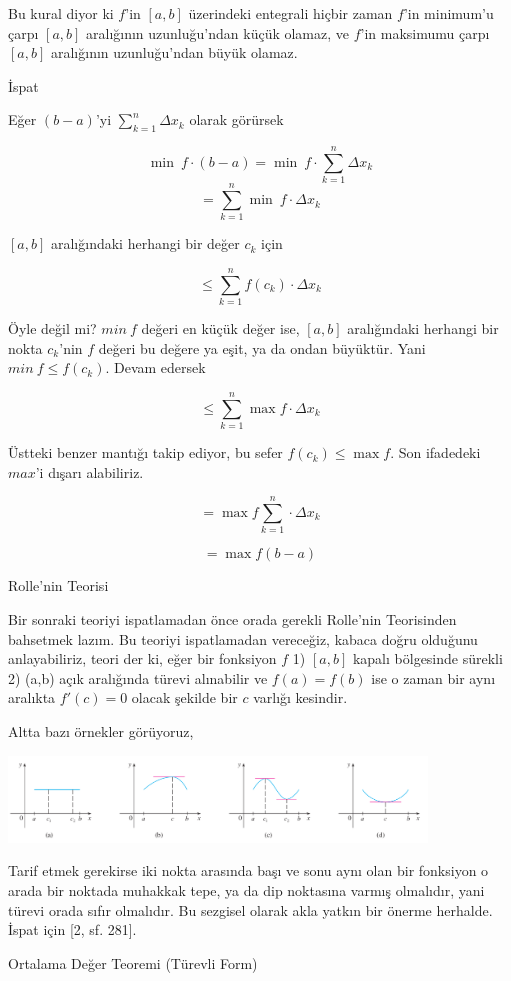 \documentclass[12pt,fleqn]{article}\usepackage{../../common}
\begin{document}
Bu kural diyor ki $f$'in $[a,b]$ üzerindeki entegrali hiçbir zaman $f$'in
minimum'u çarpı $[a,b]$ aralığının uzunluğu'ndan küçük olamaz, ve $f$'in
maksimumu çarpı $[a,b]$ aralığının uzunluğu'ndan büyük olamaz. 

İspat

Eğer $(b-a)$'yi $\sum_{k=1}^n \Delta x_k$ olarak görürsek

$$ \min \ f \cdot (b-a) = \min \ f \cdot \sum_{k=1}^n \Delta x_k $$
$$  = \sum_{k=1}^n \min \ f \cdot \Delta x_k  $$

$[a,b]$ aralığındaki herhangi bir değer $c_k$ için

$$  \le \sum_{k=1}^n f(c_k) \cdot \Delta x_k  $$

Öyle değil mi? $min \ f$ değeri en küçük değer ise, $[a,b]$ aralığındaki
herhangi bir nokta $c_k$'nin $f$ değeri bu değere ya eşit, ya da ondan
büyüktür. Yani $min \ f \le f(c_k)$. Devam edersek

$$  \le \sum_{k=1}^n \max f \cdot \Delta x_k  $$

Üstteki benzer mantığı takip ediyor, bu sefer $f(c_k) \le \max f$. Son
ifadedeki $max$'i dışarı alabiliriz. 

$$ = \max f \sum_{k=1}^n \cdot \Delta x_k  $$

$$ = \max f (b-a)  $$

Rolle'nin Teorisi

Bir sonraki teoriyi ispatlamadan önce orada gerekli Rolle'nin Teorisinden
bahsetmek lazım. Bu teoriyi ispatlamadan vereceğiz, kabaca doğru olduğunu
anlayabiliriz, teori der ki, eğer bir fonksiyon $f$ 1) $[a,b]$ kapalı bölgesinde
sürekli 2) (a,b) açık aralığında türevi alınabilir ve $f(a)=f(b)$ ise o zaman
bir aynı aralıkta $f'(c)=0$ olacak şekilde bir $c$ varlığı kesindir.

Altta bazı örnekler görüyoruz,

\includegraphics[width=30em]{calc_multi_app_02.png}

Tarif etmek gerekirse iki nokta arasında başı ve sonu aynı olan bir fonksiyon o
arada bir noktada muhakkak tepe, ya da dip noktasına varmış olmalıdır, yani
türevi orada sıfır olmalıdır. Bu sezgisel olarak akla yatkın bir önerme
herhalde. İspat için [2, sf. 281].

Ortalama Değer Teoremi (Türevli Form)
\end{document}
